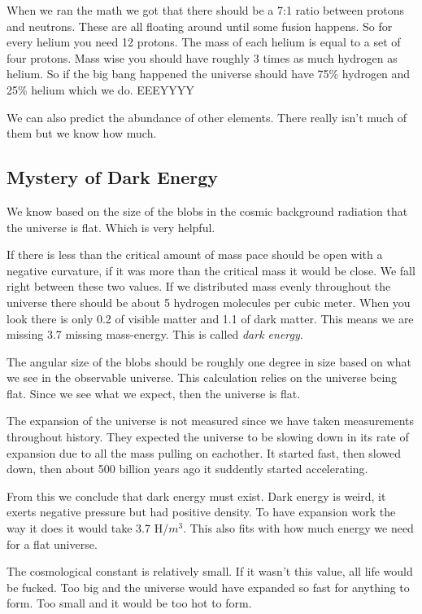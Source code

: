 \documentclass{article}
\begin{document}
When we ran the math we got that there should be a 7:1 ratio between protons and neutrons. These are all floating around until some fusion happens. So for every helium you need 12 protons. The mass of each helium is equal to a set of four protons. Mass wise you should have roughly 3 times as much hydrogen as helium. So if the big bang happened the universe should have 75\% hydrogen and 25\% helium which we do. EEEYYYY

We can also predict the abundance of other elements. There really isn't much of them but we know how much.

\subsection*{Mystery of Dark Energy}
\label{sub:mystery_of_dark_energy}
We know based on the size of the blobs in the cosmic background radiation that the universe is flat. Which is very helpful.

If there is less than the critical amount of mass pace should be open with a negative curvature, if it was more than the critical mass it would be close. We fall right between these two values. If we distributed mass evenly throughout the universe there should be about 5 hydrogen molecules per cubic meter. When you look there is only 0.2 of visible matter and 1.1 of dark matter. This means we are missing 3.7 missing mass-energy. This is called \emph{dark energy}.


The angular size of the blobs should be roughly one degree in size based on what we see in the observable universe. This calculation relies on the universe being flat. Since we see what we expect, then the universe is flat.

The expansion of the universe is not measured since we have taken measurements throughout history. They expected the universe to be slowing down in its rate of expansion due to all the mass pulling on eachother. It started fast, then slowed down, then about 500 billion years ago it suddently started accelerating.

From this we conclude that dark energy must exist. Dark energy is weird, it exerts negative pressure but had positive density. To have expansion work the way it does it would take 3.7 H/$m^3$. This also fits with how much energy we need for a flat universe.

The cosmological constant is relatively small. If it wasn't this value, all life would be fucked. Too big and the universe would have expanded so fast for anything to form. Too small and it would be too hot to form.
\end{document}
